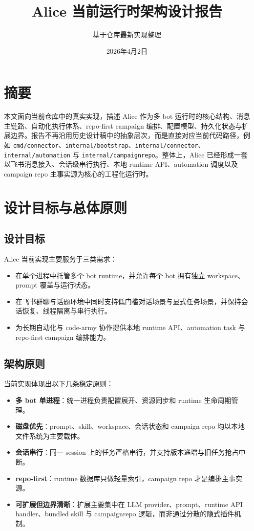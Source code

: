 \documentclass[12pt,a4paper]{ctexart}
\title{\textbf{Alice 当前运行时架构设计报告}}
\author{基于仓库最新实现整理}
\date{2026年4月2日}
\begin{document}
\maketitle
\tableofcontents
\newpage

\section{摘要}

本文面向当前仓库中的真实实现，描述 Alice 作为多 bot 运行时的核心结构、消息主链路、自动化执行体系、repo-first campaign 编排、配置模型、持久化状态与扩展边界。报告不再沿用历史设计稿中的抽象层次，而是直接对应当前代码路径，例如 \texttt{cmd/connector}、\texttt{internal/bootstrap}、\texttt{internal/connector}、\texttt{internal/automation} 与 \texttt{internal/campaignrepo}。整体上，Alice 已经形成一套以飞书消息接入、会话级串行执行、本地 runtime API、automation 调度以及 campaign repo 主事实源为核心的工程化运行时。

\section{设计目标与总体原则}

\subsection{设计目标}

Alice 当前实现主要服务于三类需求：

\begin{itemize}
  \item 在单个进程中托管多个 bot runtime，并允许每个 bot 拥有独立 workspace、prompt 覆盖与运行状态。
  \item 在飞书群聊与话题环境中同时支持低门槛对话场景与显式任务场景，并保持会话恢复、线程隔离与串行执行。
  \item 为长期自动化与 code-army 协作提供本地 runtime API、automation task 与 repo-first campaign 编排能力。
\end{itemize}

\subsection{架构原则}

当前实现体现出以下几条稳定原则：

\begin{itemize}
  \item \textbf{多 bot 单进程}：统一进程负责配置展开、资源同步和 runtime 生命周期管理。
  \item \textbf{磁盘优先}：prompt、skill、workspace、会话状态和 campaign repo 均以本地文件系统为主要载体。
  \item \textbf{会话串行}：同一 session 上的任务严格串行，并支持版本递增与旧任务抢占中断。
  \item \textbf{repo-first}：runtime 数据库只做轻量索引，campaign repo 才是编排主事实源。
  \item \textbf{可扩展但边界清晰}：扩展主要集中在 LLM provider、prompt、runtime API handler、bundled skill 与 campaignrepo 逻辑，而非通过分散的隐式插件机制。
\end{itemize}
\end{document}
